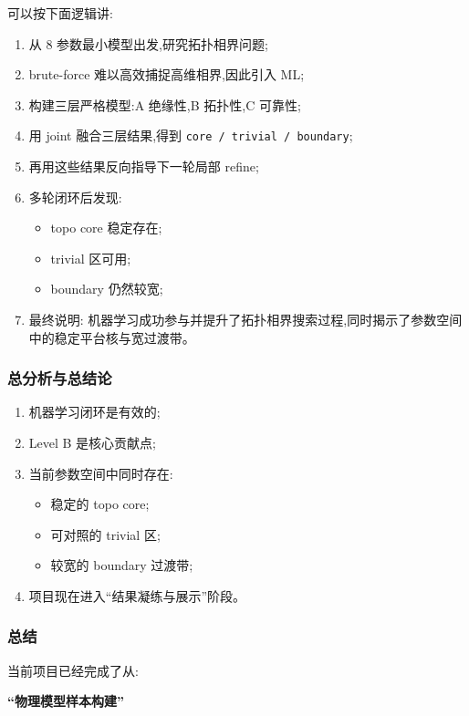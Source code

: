 \documentclass[lang=cn,scheme=chinese,color=blue,device=normal,toc=onecol,math=cm]{elegantbook}
\begin{document}
可以按下面逻辑讲:\par


\begin{enumerate}
\item 从 8 参数最小模型出发,研究拓扑相界问题;
\item brute-force 难以高效捕捉高维相界,因此引入 ML;
\item 构建三层严格模型:A 绝缘性,B 拓扑性,C 可靠性;
\item 用 joint 融合三层结果,得到 \texttt{core /\allowbreak{} trivial /\allowbreak{} boundary};
\item 再用这些结果反向指导下一轮局部 refine;
\item 多轮闭环后发现: 
\begin{itemize}
\item topo core 稳定存在;
\item trivial 区可用;
\item boundary 仍然较宽;
\end{itemize}
\item 最终说明: 机器学习成功参与并提升了拓扑相界搜索过程,同时揭示了参数空间中的稳定平台核与宽过渡带。
\end{enumerate}


\subsubsection{总分析与总结论}


\begin{enumerate}
\item 机器学习闭环是有效的;
\item Level B 是核心贡献点;
\item 当前参数空间中同时存在: 
\begin{itemize}
\item 稳定的 topo core;
\item 可对照的 trivial 区;
\item 较宽的 boundary 过渡带;
\end{itemize}
\item 项目现在进入“结果凝练与展示”阶段。
\end{enumerate}


\subsubsection{总结}


当前项目已经完成了从:\par


\textbf{“物理模型样本构建”}\par
\end{document}
